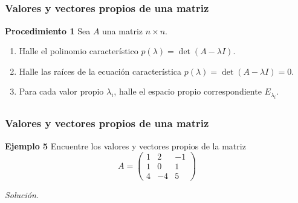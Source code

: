 
\subsection{}

\begin{frame}\frametitle{Valores y vectores propios de una matriz}
	
	\begin{ejem}{\textbf{Procedimiento 1}}\justifying
		\justifying
		Sea $A$ una matriz $n\times n$. 
		\begin{enumerate}
			\item Halle el polinomio característico $p(\lambda) = \det(A-\lambda I)$.
			\item Halle las raíces de la ecuación característica $p(\lambda) = \det(A-\lambda I) = 0$.
			\item Para cada valor propio $\lambda_i$, halle el espacio propio correspondiente $E_{\lambda_i}$.
		\end{enumerate}
	\end{ejem}		
	
\end{frame}


\subsection{}

\begin{frame}\frametitle{Valores y vectores propios de una matriz}
		
	\begin{ej}{\textbf{Ejemplo 5}}
		Encuentre los valores y vectores propios de la matriz
		\[
		A =
		\left(
		\begin{array}{rrr}
		1 & 2 & -1\\[1mm]
		1 & 0 &  1\\[1mm]
		4 & -4 & 5
		\end{array}
		\right)
		\]	
	\end{ej}

	\textit{Solución.}
	
\end{frame}


